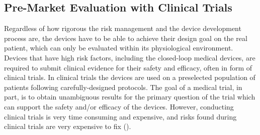\subsection{Pre-Market Evaluation with Clinical Trials}
Regardless of how rigorous the risk management and the device development process are, the devices have to be able to achieve their design goal on the real patient, which can only be evaluated within its physiological environment. Devices that have high risk factors, including the closed-loop medical devices, are required to submit clinical evidence for their safety and efficacy, often in form of clinical trials. In clinical trials the devices are used on a preselected population of patients following carefully-designed protocols. The goal of a medical trial, in part, is  to obtain unambiguous results for the primary question of the trial which can support the safety and/or efficacy of the devices. However, conducting clinical trials is very time consuming and expensive, and risks found during clinical trials are very expensive to fix (\cite{trialcost}). 


